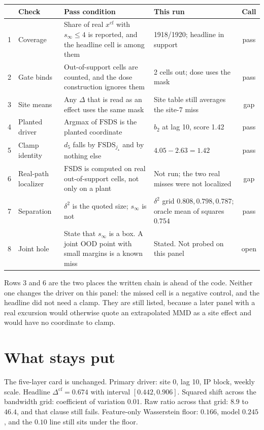 \documentclass[11pt]{article}
\begin{document}
\begin{center}
\small
\begin{tabular}{@{}clp{5.6cm}p{3.4cm}c@{}}
\toprule
& Check & Pass condition & This run & Call \\
\midrule
1 & Coverage & Share of real $x^{\mathrm{cf}}$ with $s_{\infty}\le 4$ is reported, and the headline cell is among them & 1918/1920; headline in support & pass \\
2 & Gate binds & Out-of-support cells are counted, and the dose construction ignores them & 2 cells out; dose uses the mask & pass \\
3 & Site means & Any $\Delta$ that is read as an effect uses the same mask & Site table still averages the site-7 miss & gap \\
4 & Planted driver & Argmax of $\mathrm{FSDS}$ is the planted coordinate & $b_{2}$ at lag 10, score 1.42 & pass \\
5 & Clamp identity & $d_{5}$ falls by $\mathrm{FSDS}_{j_{\star}}$ and by nothing else & $4.05-2.63=1.42$ & pass \\
6 & Real-path localizer & $\mathrm{FSDS}$ is computed on real out-of-support cells, not only on a plant & Not run; the two real misses were not localized & gap \\
7 & Separation & $\delta^{2}$ is the quoted size; $s_{\infty}$ is not & $\delta^{2}$ grid $0.808,0.798,0.787$; oracle mean of squares $0.754$ & pass \\
8 & Joint hole & State that $s_{\infty}$ is a box. A joint OOD point with small margins is a known miss & Stated. Not probed on this panel & open \\
\bottomrule
\end{tabular}
\end{center}

Rows 3 and 6 are the two places the written chain is ahead of the code.
Neither one changes the driver on this panel: the missed cell is a negative control, and the headline did not need a clamp.
They are still listed, because a later panel with a real excursion would otherwise quote an extrapolated MMD as a site effect and would have no coordinate to clamp.

\section{What stays put}

The five-layer card is unchanged.
Primary driver: site 0, lag 10, IP block, weekly scale.
Headline $\Delta^{\mathrm{cf}}=0.674$ with interval $[0.442,0.906]$.
Squared shift across the bandwidth grid: coefficient of variation $0.01$.
Raw ratio across that grid: $8.9$ to $46.4$, and that clause still fails.
Feature-only Wasserstein floor: $0.166$, model $0.245$, and the $0.10$ line still sits under the floor.
\end{document}
